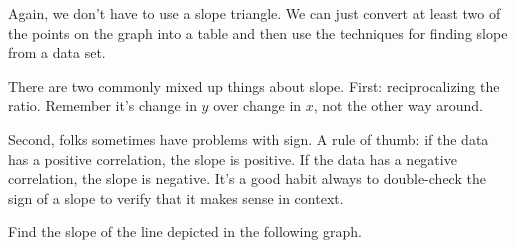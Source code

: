 Again, we don't have to use a slope triangle. We can just convert at least two of the points on the graph into a table and then use the techniques for finding slope from a data set.

There are two commonly mixed up things about slope. First: reciprocalizing the ratio. Remember it's change in $y$ over change in $x$, not the other way around.

Second, folks sometimes have problems with sign. A rule of thumb: if the data has a positive correlation, the slope is positive. If the data has a negative correlation, the slope is negative. It's a good habit always to double-check the sign of a slope to verify that it makes sense in context.

\begin{boxex}
Find the slope of the line depicted in the following graph.

\begin{center}
\end{center}


\end{boxex}
